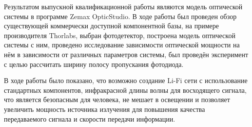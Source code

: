 \Conclusion

Результатом выпускной квалификационной работы являются модель оптической системы в программе Zemax OpticStudio. В ходе работы был проведен обзор существующей коммерчески доступной компонентной базы, на примере производителя Thorlabs, выбран фотодетектор, построена модель оптической системы с ним, проведено исследование зависимости оптической мощности на нём в зависимости от различных параметров системы, был проведён эксперимент с целью рассчитать ширину полосу пропускания фотодиода. 

В ходе работы было показано, что возможно создание Li-Fi сети с использование стандартных компонентов, инфракрасной длины волны для восходящего сигнала, что является безопасным для человека, не мешает в освещении и позволяет увеличить мощность источника излучения для повышения качества передаваемого сигнала и скорости передачи информации.